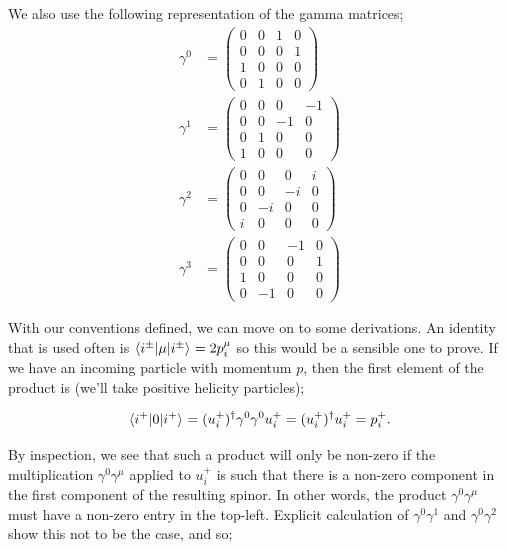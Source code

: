We also use the following representation of the gamma matrices; %
\begin{subequations}
\begin{align}
\gamma^0 &= 
 \begin{pmatrix}
  0 & 0 & 1 & 0\\
  0 & 0 & 0 & 1\\
  1 & 0 & 0 & 0\\
  0 & 1 & 0 & 0
 \end{pmatrix}\\
 \gamma^1 &= 
 \begin{pmatrix}
  0 & 0 & 0 & -1\\
  0 & 0 & -1 & 0\\
  0 & 1 & 0 & 0\\
  1 & 0 & 0 & 0
 \end{pmatrix}\\
 \gamma^2 &= 
 \begin{pmatrix}
  0 & 0 & 0 & i\\
  0 & 0 & -i & 0\\
  0 & -i & 0 & 0\\
  i & 0 & 0 & 0
 \end{pmatrix}\\
 \gamma^3 &= 
 \begin{pmatrix}
  0 & 0 & -1 & 0\\
  0 & 0 & 0 & 1\\
  1 & 0 & 0 & 0\\
  0 & -1 & 0 & 0
 \end{pmatrix}
 \end{align}
 \end{subequations}

With our conventions defined, we can move on to some derivations. An identity that is used often is $\mathinner{\langle i^\pm\vert\mu\vert i^\pm\rangle}_{} = 2p_i^\mu$ so this would be a sensible one to prove. If we have an incoming particle with momentum $p$, then the first element of the product is (we'll take positive helicity particles);

\begin{equation}
\mathinner{\langle i^+\vert0\vert i^+\rangle}_{} = (u_i^+)^\dagger \gamma^0 \gamma^0 u_i^+ =  (u_i^+)^\dagger u_i^+ = p_i^+.
\end{equation}

By inspection, we see that such a product will only be non-zero if the multiplication $\gamma^0 \gamma^\mu$ applied to $u_i^+$ is such that there is a non-zero component in the first component of the resulting spinor. In other words, the product $\gamma^0\gamma^\mu$ must have a non-zero entry in the top-left. Explicit calculation of $\gamma^0 \gamma^1$ and $\gamma^0 \gamma^2$ show this not to be the case, and so;

